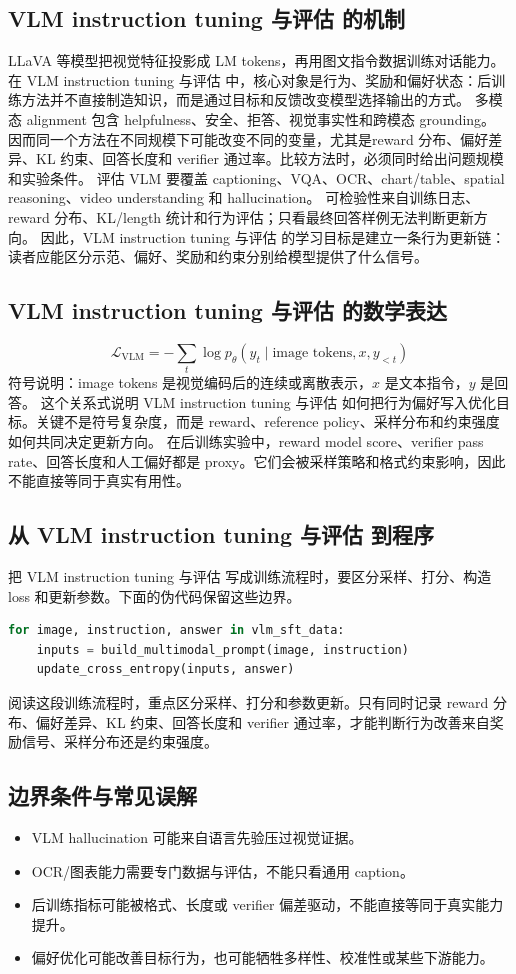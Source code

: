 \documentclass[a4paper]{article}
\begin{document}
\subsection{VLM instruction tuning 与评估 的机制}
LLaVA 等模型把视觉特征投影成 LM tokens，再用图文指令数据训练对话能力。 在 VLM instruction tuning 与评估 中，核心对象是行为、奖励和偏好状态：后训练方法并不直接制造知识，而是通过目标和反馈改变模型选择输出的方式。
多模态 alignment 包含 helpfulness、安全、拒答、视觉事实性和跨模态 grounding。 因而同一个方法在不同规模下可能改变不同的变量，尤其是reward 分布、偏好差异、KL 约束、回答长度和 verifier 通过率。比较方法时，必须同时给出问题规模和实验条件。
评估 VLM 要覆盖 captioning、VQA、OCR、chart/table、spatial reasoning、video understanding 和 hallucination。 可检验性来自训练日志、reward 分布、KL/length 统计和行为评估；只看最终回答样例无法判断更新方向。
因此，VLM instruction tuning 与评估 的学习目标是建立一条行为更新链：读者应能区分示范、偏好、奖励和约束分别给模型提供了什么信号。
\subsection{VLM instruction tuning 与评估 的数学表达}
\[\mathcal{L}_{\text{VLM}}=-\sum_t \log p_\theta(y_t\mid \text{image tokens},x,y_{<t})\]
符号说明：image tokens 是视觉编码后的连续或离散表示，\(x\) 是文本指令，\(y\) 是回答。
这个关系式说明 VLM instruction tuning 与评估 如何把行为偏好写入优化目标。关键不是符号复杂度，而是 reward、reference policy、采样分布和约束强度如何共同决定更新方向。
在后训练实验中，reward model score、verifier pass rate、回答长度和人工偏好都是 proxy。它们会被采样策略和格式约束影响，因此不能直接等同于真实有用性。
\subsection{从 VLM instruction tuning 与评估 到程序}
把 VLM instruction tuning 与评估 写成训练流程时，要区分采样、打分、构造 loss 和更新参数。下面的伪代码保留这些边界。
\begin{lstlisting}[language=Python]
for image, instruction, answer in vlm_sft_data:
    inputs = build_multimodal_prompt(image, instruction)
    update_cross_entropy(inputs, answer)
\end{lstlisting}
阅读这段训练流程时，重点区分采样、打分和参数更新。只有同时记录 reward 分布、偏好差异、KL 约束、回答长度和 verifier 通过率，才能判断行为改善来自奖励信号、采样分布还是约束强度。
\subsection{边界条件与常见误解}
\begin{itemize}
\item VLM hallucination 可能来自语言先验压过视觉证据。
\item OCR/图表能力需要专门数据与评估，不能只看通用 caption。
\item 后训练指标可能被格式、长度或 verifier 偏差驱动，不能直接等同于真实能力提升。
\item 偏好优化可能改善目标行为，也可能牺牲多样性、校准性或某些下游能力。
\end{itemize}
\end{document}
